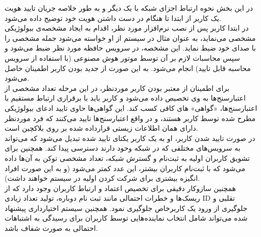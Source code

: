 \documentclass{article}
\begin{document}
\begin{itemize}
در این بخش نحوه ارتباط اجزای شبکه با یک دیگر و به طور خلاصه جریان تایید هویت یک کاربر از ابتدا تا هنگام در دست داشتن هویت خود توضیح داده می‌شود.
\\
در ابتدا کاربر پس از نصب نرم‌افزار مورد نظر، اقدام به ایجاد مشخصه‌ی بیولوژیکی مشخصی می‌‌نماید، به عنوان مثال در سیستم از او خواسته می‌شود جمله مشخصی را با صدای خود ضبط نماید. این مشخصه، در سرویس حافظه مورد نظر ضبط می‌شود و سپس محاسبات لازم بر آن توسط موتور هوش مصنوعی (با استفاده از سرویس محاسبه قابل تایید) انجام می‌شود. به این صورت از جدید بودن کاربر اطمینان حاصل می‌شود.
\\
برای اطمینان از معتبر بودن کاربر موردنظر، در این مرحله تعداد مشخصی از اعتبارسنج‌ها به وی تخصیص داده می‌شود و کاربر باید با برقراری ارتباط مستقیم با اعتبارسنج‌ها، «گواهی» های کافی کسب کند. این گواهی‌ها حاوی تایید ادعای بیولوژیکی مطرح شده توسط کاربر هستند، و در واقع اعتبارسنج‌ها تایید می‌کنند که فرد موردنظر دارای همان اطلاعات زیستی قرارداده شده بر روی بلاکچین است.
\\
در صورت تایید شدن کاربر، او به یک کاربر یکتای تایید شده تبدیل می‌شود که می‌تواند به سرویس‌های مختلفی که در شبکه وحود دارند دسترسی پیدا کند. همچنین برای تشویق کاربران اولیه به ثبت‌نام و گسترش شبکه، تعداد مشخصی توکن به آن‌ها داده می‌شود که با ثبت‌نام کاربران بیشتر، این عدد کمتر می‌شود (و به این صورت افراد انگیزه بیشتری برای شرکت کردن اولیه در سیستم خواهند داشت). 
\\
همچنین سازوکار دقیقی برای تخصیص اعتماد و ارتباط کاربران وجود دارد که از ریسک‌ها و خطرات احتمالی مانند ثبت نام دوباره، تولید تعداد زیادی ID تقلبی و جلوگیری از ورود یک کاربرخاص جلوگیری نمود. همچنین سیستم اختیارداری پیشنهاد شده می‌تواند شامل انتخاب نماینده‌هایی توسط کاربران برای رسیدگی به اشتباهات احتمالی به صورت شفاف باشد. 

\end{itemize}
\end{document}
